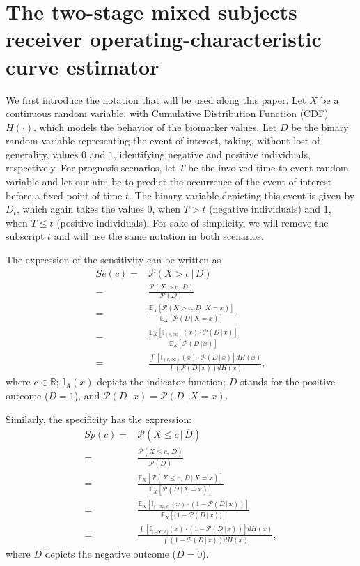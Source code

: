 \section{The two-stage mixed subjects receiver operating-characteristic curve estimator} \label{sec:s2}
We first introduce the notation that will be used along this paper. Let $X$ be a continuous random variable, with Cumulative Distribution Function (CDF) $H(\cdot)$, which models the behavior of the biomarker values. Let $D$ be the binary random variable representing the event of interest, taking, without lost of generality, values $0$ and $1$, identifying negative and positive individuals, respectively. For prognosis scenarios, let $T$ be the involved time-to-event random variable and let our aim be to predict the occurrence of the event of interest before a fixed point of time $t$. The binary variable depicting this event is given by $D_{t}$, which again takes the values $0$, when $T >t$ (negative individuals) and $1$, when $T \leq t$ (positive individuals). For sake of simplicity, we will remove the subscript $t$ and will use the same notation in both scenarios. 

The expression of the sensitivity can be written as
\begin{align}
 Se(c)  =& {\mathcal P}(X>c\,|\,D) \nonumber\\
          =& \frac{{\mathcal P}(X>c,\,D)}{{\mathcal P}(D)} \nonumber\\
          =&\frac{\mathbb E_X[{\mathcal P}(X>c,\,D\,|\,X =x)]}{\mathbb E_X[{\mathcal P}(D\,|\, X = x)]}\nonumber \\
         =&\frac{\mathbb E_X[{\mathbb {I}}_{(c,\infty)}(x)\cdot {\mathcal P}(D\,|\,x)]}{\mathbb E_X[{\mathcal P}(D\,|\, x)]}\nonumber \\
          =&\frac{ {\displaystyle \int }[{\mathbb {I}}_{(c,\infty)}(x)\cdot {\mathcal P}(D\,|\,x)]dH(x)}{{\displaystyle \int }({\mathcal P}(D\,|\, x))dH(x)}, \label{R21}
\end{align}
where $c \in \mathbb{R}$; ${\mathbb {I}}_A(x)$ depicts the indicator function; $D$ stands for the positive outcome ($D = 1$), and ${\mathcal{P}}(D\,|\,x) = {\mathcal{P}}(D\,|\,X =x) $. 

Similarly, the specificity has the expression:
\begin{align}
Sp(c)  =& {\mathcal P}(X \leq c\,|\,\overline{D}) \nonumber\\
          =& \frac{{\mathcal P}(X \leq c,\,\overline{D})}{{\mathcal P}(\overline{D})} \nonumber\\
          =&\frac{\mathbb E_X[{\mathcal P}(X  \leq c,\,\overline{D}\,|\,X=x)]}{\mathbb E_X[{\mathcal P}(\overline{D}\,|\, X=x)]}\nonumber \\
          =&\frac{\mathbb E_X[{\mathbb {I}}_{(-\infty,c]}(x)\cdot ( 1 - {\mathcal P}(D\,|\,x))]}{\mathbb E_X[{( 1 - \mathcal P}(D\,|\, x))]}\nonumber \\
          =&\frac{{\displaystyle \int } [{\mathbb {I}}_{(-\infty, c]}(x)\cdot(1- {\mathcal P}(D\,|\,x))]dH(x)}{{\displaystyle \int }(1 - {\mathcal P}(D\,|\, x))dH(x)}, \label{R22}
\end{align}
where $\overline{D}$ depicts the negative outcome ($D = 0$).

